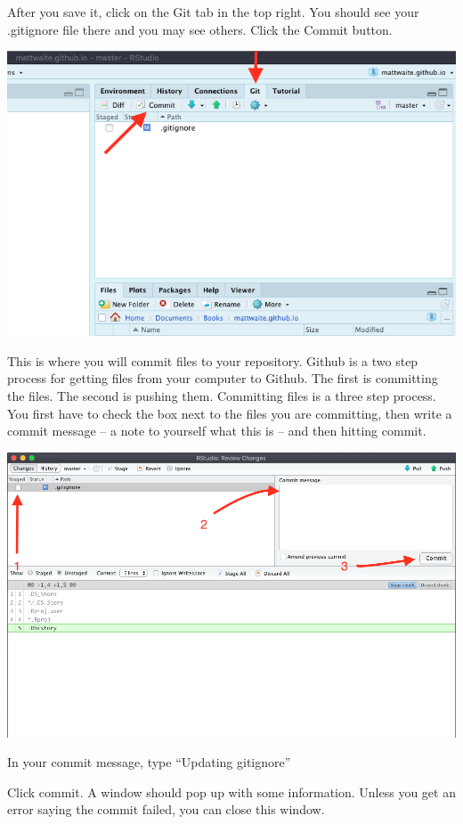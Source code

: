 \documentclass[
]{book}
\begin{document}
After you save it, click on the Git tab in the top right. You should see your .gitignore file there and you may see others. Click the Commit button.

\includegraphics[width=10.08in]{images/blog12}

This is where you will commit files to your repository. Github is a two step process for getting files from your computer to Github. The first is committing the files. The second is pushing them. Committing files is a three step process. You first have to check the box next to the files you are committing, then write a commit message -- a note to yourself what this is -- and then hitting commit.

\includegraphics[width=13.92in]{images/blog13}

In your commit message, type ``Updating gitignore''

Click commit. A window should pop up with some information. Unless you get an error saying the commit failed, you can close this window.
\end{document}
